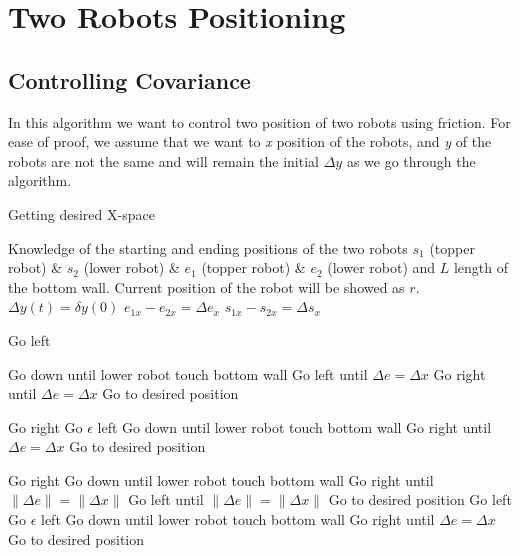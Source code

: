 
\section{Two Robots Positioning}\label{sec:algorithm}


\subsection{Controlling Covariance}

In this algorithm we want to control two position of two robots using friction. For ease of proof, we assume that we want to \emph{x} position of the robots, and \emph{y} of the robots are not the same and will remain the initial $\Delta y $ as we go through the algorithm.
\begin{algorithm}
\caption{Getting desired X-space}\label{alg:CovarianceControl}
\begin{algorithmic}[1]
\Require Knowledge of the starting and ending positions  of the two robots $s_1$ (topper robot) \& $s_2$ (lower robot)  \& $e_1$ (topper robot) \& $e_2$ (lower robot) and $L$ length of the bottom wall. Current position of the robot will be showed as $r$.
\Ensure $\Delta y(t) = \delta y(0)$ 
\State $e_{1x} - e_{2x} = \Delta e_x$
\State $s_{1x} - s_{2x} = \Delta s_x$
\Loop

\State Go left
\EndWhile

\State Go down until lower robot touch bottom wall
\State Go left until $\Delta e = \Delta x$
\Else Go right until $\Delta e = \Delta x$
\EndIf
\State Go to desired position
\EndIf

\State Go right
\EndWhile
{}
\State Go $\epsilon$ left 
\EndIf
\State Go down until lower robot touch bottom wall
\State Go right until $\Delta e = \Delta x$
\State Go to desired position
\EndIf

\State Go right
\EndWhile
\State Go down until lower robot touch bottom wall
\State Go right until $\|\Delta e\| = \|\Delta x\|$
\Else Go left until $\|\Delta e\| = \|\Delta x\|$
\EndIf
\State Go to desired position
\EndIf
\newpage
{}
\State Go left
\EndWhile
{}
\State Go $\epsilon$ left 
\EndIf
\State Go down until lower robot touch bottom wall
\State Go right until $\Delta e = \Delta x$
\State Go to desired position
\EndIf

\EndLoop
\end{algorithmic}
\end{algorithm}


